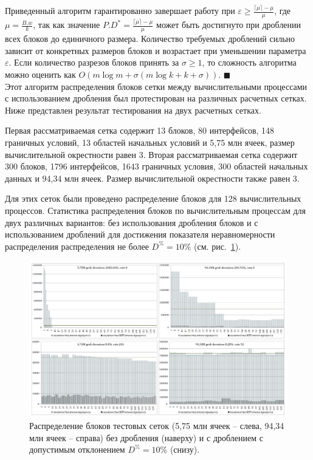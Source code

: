 Приведенный алгоритм гарантированно завершает работу при $\varepsilon \ge \frac{\lceil \mu \rceil - \mu}{\mu}$, где $\mu = \frac{B.w}{k}$, так как значение $P.D^{*} = \frac{\lceil \mu \rceil - \mu}{\mu}$ может быть достигнуто при дроблении всех блоков до единичного размера.
Количество требуемых дроблений сильно зависит от конкретных размеров блоков и возрастает при уменьшении параметра $\varepsilon$.
Если количество разрезов блоков принять за $\sigma \ge 1$, то сложность алгоритма можно оценить как $O(m \log m + \sigma(m \log k + k + \sigma))$.
$\blacksquare$\\

Этот алгоритм распределения блоков сетки между вычислительными процессами с использованием дробления был протестирован на различных расчетных сетках.
Ниже представлен результат тестирования на двух расчетных сетках.

Первая рассматриваемая сетка содержит 13 блоков, 80 интерфейсов, 148 граничных условий, 13 областей начальных условий и 5,75 млн ячеек, размер вычислительной окрестности равен 3.
Вторая рассматриваемая сетка содержит 300 блоков, 1796 интерфейсов, 1643 граничных условия, 300 областей начальных данных и 94,34 млн ячеек.
Размер вычислительной окрестности также равен 3.

Для этих сеток были проведено распределение блоков для 128 вычислительных процессов.
Статистика распределения блоков по вычислительным процессам для двух различных вариантов: без использования дробления блоков и с использованием дроблений для достижения показателя неравномерности распределения распределения не более $D^{\%} = 10\%$ (см. рис.~\ref{fig:text_2_withcut_charts}).

\begin{figure}[ht]
\centering
\includegraphics[width=1.0\textwidth]{fig/par_withcut-charts.pdf}
\singlespacing
{}\caption{Распределение блоков тестовых сеток (5,75 млн ячеек -- слева, 94,34 млн ячеек -- справа) без дробления (наверху) и с дроблением с допустимым отклонением $D^{\%} = 10\%$ (снизу).}
\label{fig:text_2_withcut_charts}
\end{figure}

